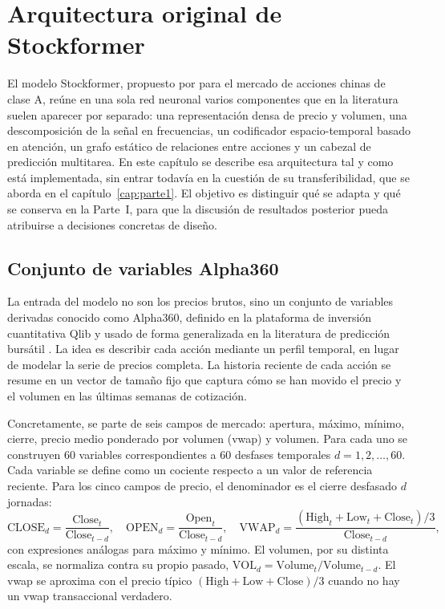\chapter{Arquitectura original de Stockformer}\label{cap:stockformer}

El modelo Stockformer, propuesto por \textcite{ma2024stockformer} para el mercado de
acciones chinas de clase A, reúne en una sola red neuronal varios componentes que en la
literatura suelen aparecer por separado: una representación densa de precio y volumen, una
descomposición de la señal en frecuencias, un codificador espacio-temporal basado en
atención, un grafo estático de relaciones entre acciones y un cabezal de predicción
multitarea. En este capítulo se describe esa arquitectura tal y como está implementada, sin
entrar todavía en la cuestión de su transferibilidad, que se aborda en el
capítulo~\ref{cap:parte1}. El objetivo es distinguir qué se adapta y qué se conserva en la
Parte~I, para que la discusión de resultados posterior pueda atribuirse a decisiones
concretas de diseño.

\section{Conjunto de variables Alpha360}\label{sec:alpha360}

La entrada del modelo no son los precios brutos, sino un conjunto de variables derivadas
conocido como Alpha360, definido en la plataforma de inversión cuantitativa Qlib
\autocite{yang2020qlib} y usado de forma generalizada en la literatura de predicción
bursátil \autocite{gu2020empirical}. La idea es describir cada acción mediante un perfil
temporal, en lugar de modelar la serie de precios completa. La historia reciente de cada
acción se resume en un vector de tamaño fijo que captura cómo se han movido el precio y el
volumen en las últimas semanas de cotización.

Concretamente, se parte de seis campos de mercado: apertura, máximo, mínimo, cierre,
precio medio ponderado por volumen (vwap) y volumen. Para cada uno se construyen 60
variables correspondientes a 60 desfases temporales $d = 1, 2, \dots, 60$. Cada variable se define como un cociente
respecto a un valor de referencia reciente. Para los cinco campos de precio, el
denominador es el cierre desfasado $d$ jornadas:
\[
\text{CLOSE}_d = \frac{\text{Close}_t}{\text{Close}_{t-d}}, \quad
\text{OPEN}_d = \frac{\text{Open}_t}{\text{Close}_{t-d}}, \quad
\text{VWAP}_d = \frac{(\text{High}_t + \text{Low}_t + \text{Close}_t)/3}{\text{Close}_{t-d}},
\]
con expresiones análogas para máximo y mínimo. El volumen, por su distinta escala, se
normaliza contra su propio pasado, $\text{VOL}_d = \text{Volume}_t /
\text{Volume}_{t-d}$. El vwap se aproxima con el precio típico
$(\text{High}+\text{Low}+\text{Close})/3$ cuando no hay un vwap transaccional verdadero.

